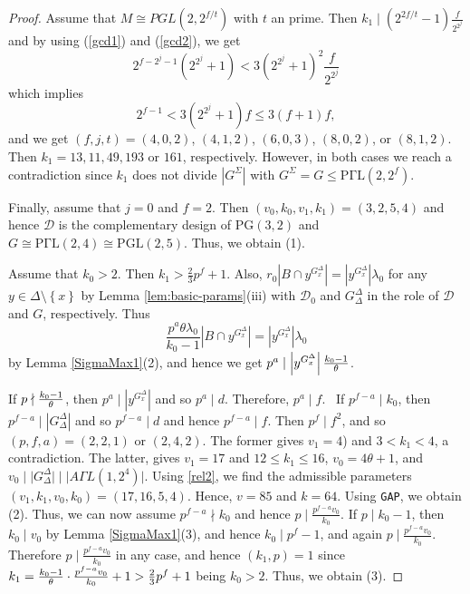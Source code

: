 \documentclass[a4paper,twopage,reqno,12pt]{amsart}
\theoremstyle{definition}
\numberwithin{equation}{section}
\newcommand{\PGL}{\mathrm{PGL}}
\newcommand{\PGaL}{\mathrm{P\Gamma L}}
\newcommand{\PG}{\mathrm{PG}}
\renewcommand{\leq}{\leqslant}
\begin{document}
\begin{proof}
Assume that $M \cong PGL(2,2^{f/t})$ with $t$ an prime. Then $k_{1}\mid \left( 2^{2f/t}-1\right)\frac{f}{2^{2^j}}$  and by using (\ref{gcd1}) and (\ref{gcd2}), we get 
$$2^{f-2^{j}-1}(2^{2^{j}}+1)<3(2^{2^{j}}+1)^{2}\frac{f}{2^{2^j}}$$
which implies 
$$2^{f-1}<3(2^{2^{j}}+1)f\leq 3(f+1)f,$$
and we get $(f,j,t)=(4,0,2)$, $(4,1,2)$, $(6,0,3)$, $(8,0,2)$, or $(8,1,2)$. Then $k_1=13,11,49,193$ or $161$, respectively. However, in both cases we reach a contradiction since $k_1$ does not divide $\left\vert G^{\Sigma
}\right\vert $ with $G^{\Sigma }=G\leq \PGaL(2,2^{f})$.

Finally, assume that $j=0$ and $f=2$. Then $(v_{0},k_{0},v_{1},k_{1})=(3,2,5,4)$ and
hence $\mathcal{D}$ is the complementary design of $\PG(3,2)$ and $G\cong \PGaL(2,4)\cong \PGL(2,5)$. Thus, we obtain (1).

Assume that $k_{0}>2$. Then $k_{1}>\frac{2}{3}p^{f}+1$. Also, $%
r_{0}\left\vert B\cap y^{G_{x}^{\Delta }}\right\vert =\left\vert
y^{G_{x}^{\Delta }}\right\vert \lambda _{0}$ for any $y\in \Delta \setminus
\left\{ x\right\} $ by Lemma \ref{lem:basic-params}(iii) with $\mathcal{D}_{0}$ and $G_{\Delta }^{\Delta }$ in the role of $\mathcal{D}$ and $G$, respectively. Thus 
\[
\frac{p^{a}\theta \lambda _{0}}{k_{0}-1}\left\vert B\cap y^{G_{x}^{\Delta
}}\right\vert =\left\vert y^{G_{x}^{\Delta }}\right\vert \lambda _{0} 
\]%
by Lemma \ref{SigmaMax1}(2), and hence we get $p^{a}\mid \left\vert y^{G_{x}^{\Delta }}\right\vert \frac{k_{0}-1}{%
\theta }$. 

If $p \nmid \frac{k_{0}-1}{%
\theta }$, then $p^{a}\mid \left\vert y^{G_{x}^{\Delta }}\right\vert $ and
so $p^{a}\mid d$. Therefore, $p^{a}\mid f$. \ If $p^{f-a}\mid k_{0}$, then $%
p^{f-a}\mid \left\vert G_{\Delta }^{\Delta }\right\vert $ and so $%
p^{f-a}\mid d$ and hence $p^{f-a}\mid f$. Then $p^{f}\mid f^{2}$, and so $%
(p,f,a)=(2,2,1)$ or $(2,4,2)$. The former gives $v_1=4$) and $3<k_{1}<4$, a contradiction. The latter, gives $v_1=17$ and $12\le k_1\le 16$, $v_0=4\theta+1$, and $v_0\mid \lvert G_\Delta^\Delta\rvert \mid \lvert A\Gamma L(1,2^4)\rvert$. Using \ref{rel2}, we find the admissible parameters $(v_1,k_1,v_0,k_0)=(17, 16, 5, 4)$. Hence, $v=85$ and $k=64$. Using \texttt{GAP}, we obtain (2).
Thus, we can now assume $%
p^{f-a}\nmid k_{0}$ and hence $p\mid \frac{p^{f-a}v_{0}}{k_{0}}$. If $p\mid k_{0}-1$, then $k_{0} \mid v_{0}$ by Lemma \ref{SigmaMax1}(3), and hence $k_{0} \mid p^{f}-1$, and again $p\mid \frac{p^{f-a}v_{0}}{k_{0}}$. Therefore $p\mid \frac{p^{f-a}v_{0}}{k_{0}}$ in any case, and hence 
$(k_{1},p)=1$ since $k_{1}=\frac{k_{0}-1}{\theta }\cdot \frac{p^{f-a}v_{0}}{%
k_{0}}+1>\frac{2}{3}p^{f}+1$ being $k_{0}>2$. Thus, we obtain (3).
\end{proof}
\end{document}

